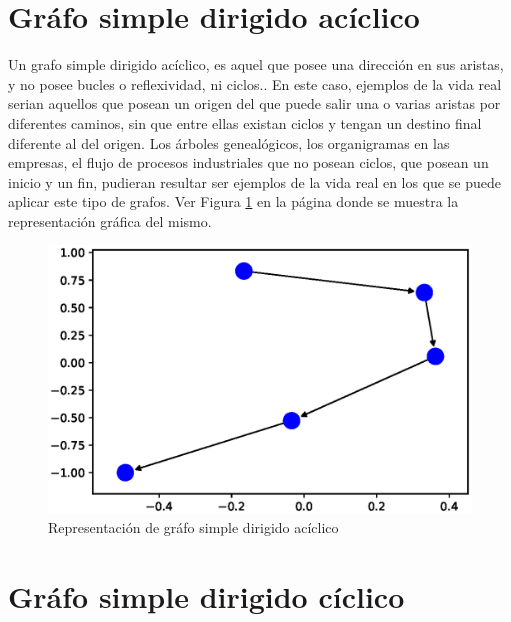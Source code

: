 \documentclass{article}
\begin{document}
\section{Gráfo simple dirigido acíclico}

Un grafo simple dirigido acíclico, es aquel que posee una dirección en sus aristas, y no posee bucles o reflexividad, ni ciclos.\cite{Elisa}. 
En este caso, ejemplos de la vida real serian aquellos que posean un origen del que puede salir una o varias aristas por diferentes caminos, sin que entre ellas existan ciclos y tengan un destino final diferente al del origen. Los árboles genealógicos, los organigramas en las empresas, el flujo de procesos industriales que no posean ciclos, que posean un inicio y un fin, pudieran resultar ser ejemplos de la vida real en los que se puede aplicar este tipo de grafos. Ver Figura \ref{fig:Fig04} en la página \pageref{fig:Fig04} donde se muestra la representación gráfica del mismo. 



\begin{figure}
    \centering
    \includegraphics[scale=0.4]{imagenes/Fig04.eps}
    \caption{Representación de gráfo simple dirigido acíclico}
    \label{fig:Fig04}
\end{figure}


\section{Gráfo simple dirigido cíclico}
\end{document}

